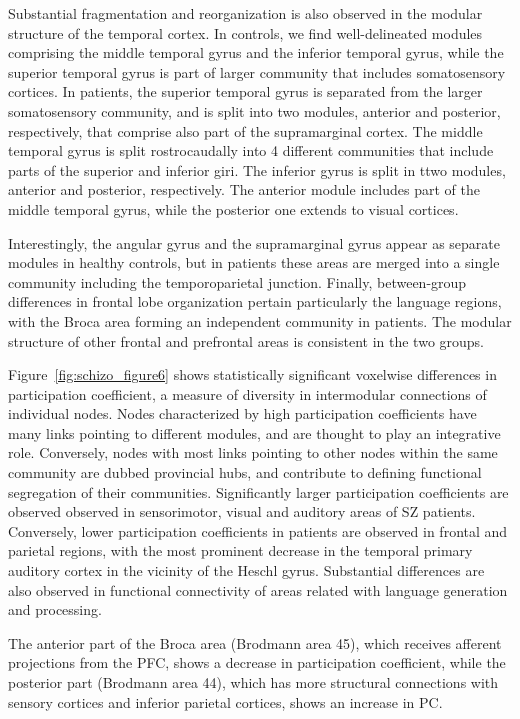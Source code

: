 Substantial fragmentation and reorganization is also observed in the modular structure of the temporal cortex.
In controls, we find well-delineated modules comprising the middle temporal gyrus and the inferior temporal gyrus, while the superior temporal gyrus is part of larger community that includes somatosensory cortices.
In patients, the superior temporal gyrus is separated from the larger somatosensory community, and is split into two modules, anterior and posterior, respectively, that comprise also part of the supramarginal cortex.
The middle temporal gyrus is split rostrocaudally into 4 different communities that include parts of the superior and inferior giri.
The inferior gyrus is split in ttwo modules, anterior and posterior, respectively.
The anterior module includes part of the middle temporal gyrus, while the posterior one extends to visual cortices. 

Interestingly, the angular gyrus and the supramarginal gyrus appear as separate modules in healthy controls, but in patients these areas are merged into a single community including the temporoparietal junction. 
Finally, between-group differences in frontal lobe organization pertain particularly the language regions, with the Broca area forming an independent community in patients.
The modular structure of other frontal and prefrontal areas is consistent in the two groups.

Figure~\ref{fig:schizo_figure6} shows statistically significant voxelwise differences in participation coefficient, a measure of diversity in intermodular connections of individual nodes.
Nodes characterized by high participation coefficients have many links pointing to different modules, and are thought to play an integrative role. 
Conversely, nodes with most links pointing to other nodes within the same community are dubbed provincial hubs, and contribute to defining functional segregation of their communities.
Significantly larger participation coefficients are observed observed in sensorimotor, visual and auditory areas of SZ patients.
Conversely, lower participation coefficients in patients are observed in frontal and parietal regions, with the most prominent decrease in the temporal primary auditory cortex in the vicinity of the Heschl gyrus.
Substantial differences are also observed in functional connectivity of areas related with language generation and processing.

The anterior part of the Broca area (Brodmann area 45), which receives afferent projections from the PFC, shows a decrease in participation coefficient, while the posterior part (Brodmann area 44), which has more structural connections with sensory cortices and inferior parietal cortices, shows an increase in PC. 

